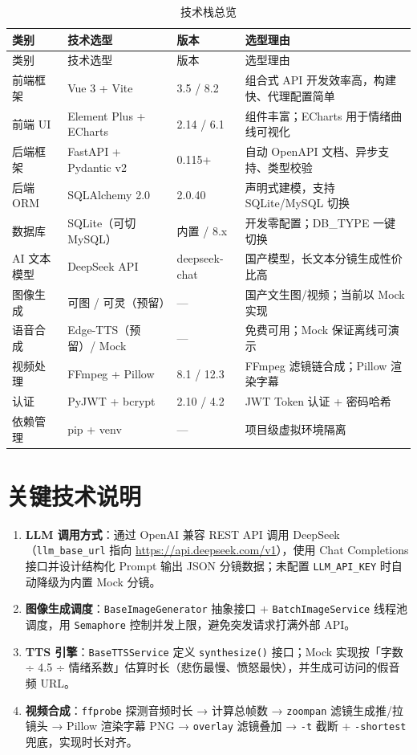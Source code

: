\documentclass[12pt]{ctexrep}
\begin{document}
\begin{longtable}{p{3cm}p{3.8cm}p{2cm}p{6.2cm}}
\caption{技术栈总览}\label{tab:stack}\\
\toprule
类别 & 技术选型 & 版本 & 选型理由\\
\midrule
\endfirsthead
\toprule
类别 & 技术选型 & 版本 & 选型理由\\
\midrule
\endhead
前端框架 & Vue 3 + Vite & 3.5 / 8.2 & 组合式 API 开发效率高，构建快、代理配置简单\\
前端 UI & Element Plus + ECharts & 2.14 / 6.1 & 组件丰富；ECharts 用于情绪曲线可视化\\
后端框架 & FastAPI + Pydantic v2 & 0.115+ & 自动 OpenAPI 文档、异步支持、类型校验\\
后端 ORM & SQLAlchemy 2.0 & 2.0.40 & 声明式建模，支持 SQLite/MySQL 切换\\
数据库 & SQLite（可切 MySQL） & 内置 / 8.x & 开发零配置；DB\_TYPE 一键切换\\
AI 文本模型 & DeepSeek API & deepseek-chat & 国产模型，长文本分镜生成性价比高\\
图像生成 & 可图 / 可灵（预留） & — & 国产文生图/视频；当前以 Mock 实现\\
语音合成 & Edge-TTS（预留）/ Mock & — & 免费可用；Mock 保证离线可演示\\
视频处理 & FFmpeg + Pillow & 8.1 / 12.3 & FFmpeg 滤镜链合成；Pillow 渲染字幕\\
认证 & PyJWT + bcrypt & 2.10 / 4.2 & JWT Token 认证 + 密码哈希\\
依赖管理 & pip + venv & — & 项目级虚拟环境隔离\\
\bottomrule
\end{longtable}

\section{关键技术说明}

\begin{enumerate}
\item \textbf{LLM 调用方式}：通过 OpenAI 兼容 REST API 调用 DeepSeek（\texttt{llm\_base\_url} 指向 \url{https://api.deepseek.com/v1}），使用 Chat Completions 接口并设计结构化 Prompt 输出 JSON 分镜数据；未配置 \texttt{LLM\_API\_KEY} 时自动降级为内置 Mock 分镜。
\item \textbf{图像生成调度}：\texttt{BaseImageGenerator} 抽象接口 + \texttt{BatchImageService} 线程池调度，用 \texttt{Semaphore} 控制并发上限，避免突发请求打满外部 API。
\item \textbf{TTS 引擎}：\texttt{BaseTTSService} 定义 \texttt{synthesize()} 接口；Mock 实现按「字数 ÷ 4.5 ÷ 情绪系数」估算时长（悲伤最慢、愤怒最快），并生成可访问的假音频 URL。
\item \textbf{视频合成}：\texttt{ffprobe} 探测音频时长 → 计算总帧数 → \texttt{zoompan} 滤镜生成推/拉镜头 → Pillow 渲染字幕 PNG → \texttt{overlay} 滤镜叠加 → \texttt{-t} 截断 + \texttt{-shortest} 兜底，实现时长对齐。
\end{enumerate}
\end{document}
